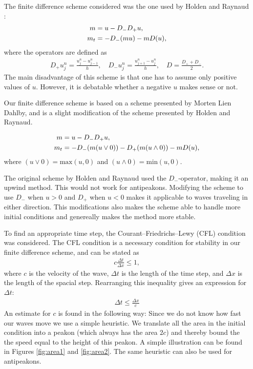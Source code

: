 The finite difference scheme considered was the one used by Holden and Raynaud \cite{holden2006convergence}:
\begin{align}
m &= u - D_{-}D_{+}u, \notag \\ 
m_t &= -D_{-}(mu) - mD(u),
\label{eq:discretized}
\end{align}
where the operators are defined as
\begin{align}
\label{eq:operators}
D_{+}u_{j}^{n} = \frac{u_{j}^{n}-u_{j-1}^{n}}{h},\quad
D_{-}u_{j}^{n} = \frac{u_{j+1}^{n}-u_{j}^{n}}{h},\quad
D = \frac{D_{+}+D_{-}}{2}.
\end{align}
The main disadvantage of this scheme is that one has to assume only positive values of $u$. However, it is debatable whether a negative $u$ makes sense or not.

Our finite difference scheme is based on a scheme presented by Morten Lien Dahlby\cite{dahlby2007geometric}, and is a slight modification of the scheme presented by Holden and Raynaud.

\begin{align}
m &= u - D_{-}D_{+}u, \notag \\ 
m_t &= -D_{-}(m(u \vee 0)) -D_{+}(m(u \wedge 0)) - mD(u), 
\label{eq:modscheme}
\end{align}
where $(u \vee 0) = \text{max}(u,0)$ and $(u \wedge 0) = \text{min}(u,0)$.

The original scheme by Holden and Raynaud used the $D_{-}$-operator, making it an upwind method. This would not work for antipeakons. Modifying the scheme to use  $D_{-}$ when $u > 0$ and $D_{+}$ when $ u < 0$ makes it applicable to waves traveling in either direction. This modifications also makes the scheme able to handle more initial conditions and genereally makes the method more stable. 

To find an appropriate time step, the Courant–Friedrichs–Lewy (CFL) condition was considered. The CFL condition is a necessary condition for stability in our finite difference scheme, and can be stated as
\begin{align*}
c\frac{\Delta t}{\Delta x} \leq 1,
\end{align*}
where $c$ is the velocity of the wave, $\Delta t$ is the length of the time step, and $\Delta x$ is the length of the spacial step. Rearranging this inequality gives an expression for $\Delta t$:
\begin{align*}
\Delta t \leq \frac{\Delta x}{c}
\end{align*}
An estimate for $c$ is found in the following way: Since we do not know how fast our waves move we use a simple heuristic. We translate all the area in the initial condition into a peakon (which always has the area $2c$) and thereby bound the the speed equal to the height of this peakon. A simple illustration can be found in Figures \ref{fig:area1} and \ref{fig:area2}. The same heuristic can also be used for antipeakons.


